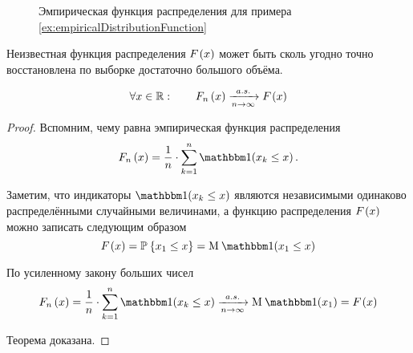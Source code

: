 \begin{figure}[h!]
  \center
  \caption{Эмпирическая функция распределения для примера
    \ref{ex:empiricalDistributionFunction}}
  \label{fig:tikz:empiricalDistributionFunction}
\end{figure}

Неизвестная функция распределения $F_{}\left(x\right)$ может быть сколь угодно
точно восстановлена по выборке достаточно большого объёма.

\begin{theorem}\label{theorem:distributionFunction:empiricalToCumulative}
  \begin{equation*}
    \forall x \in \mathbb{R}: \qquad F_n\left(x\right) \xrightarrow[n\to\infty]{a.s.} F_{}\left(x\right)
  \end{equation*}
\end{theorem}
\begin{proof}%
Вспомним, чему равна эмпирическая функция распределения
\begin{equation*}
  \cdfn{x} = \frac{1}{n} \cdot \sum_{k=1}^n \indicator{x_k\le x}.
\end{equation*}

Заметим, что индикаторы $\indicator{x_k\le x}$
являются независимыми одинаково распределёнными случайными величинами,
а функцию распределения $F_{}\left(x\right)$ можно записать следующим образом
\begin{equation*}
  \cdf{x}
  = \Probability{x_1\le x}
  = \mean{\indicator{x_1\le x}}
\end{equation*}

По усиленному закону больших чисел
\begin{equation*}
  \cdfn{x}
  = \frac{1}{n} \cdot \sum_{k=1}^n \indicator{x_k\le x}
    \acovergence \mean{\indicator{x_1}}
  = \cdf{x}
\end{equation*}

Теорема доказана.
\end{proof}

\begin{comment}
В приведённом утверждении речь шла о сходимости $F_n$ к $F$ в фиксированной
точке.
Однако можно проверить, что $F_n$ сходятсяя к $F$ слабо как функции
распределения.

\begin{theorem}
  \label{theorem:convergenceFProbability}
  \begin{equation*}
    \probability{F_n \Covergence{} F} = 1
  \end{equation*}
\end{theorem}
\end{comment}

